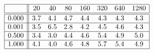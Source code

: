 \[
\begin{array}{|c||ccccccc|}
\hline 
& 20 & 40 & 80 & 160 & 320 & 640 & 1280\\
\hline \hline 
0.000 & 3.7 & 4.1 & 4.7 & 4.4 & 4.3 & 4.3 & 4.3 \\ \hline 
0.001 & 3.5 & 6.5 & 2.8 & 4.2 & 4.5 & 4.6 & 4.3 \\ \hline 
0.500 & 3.4 & 3.0 & 4.4 & 4.6 & 5.4 & 4.9 & 5.0 \\ \hline 
1.000 & 4.1 & 4.0 & 4.6 & 4.8 & 5.7 & 5.4 & 4.9 \\ \hline 
\end{array}
\]

